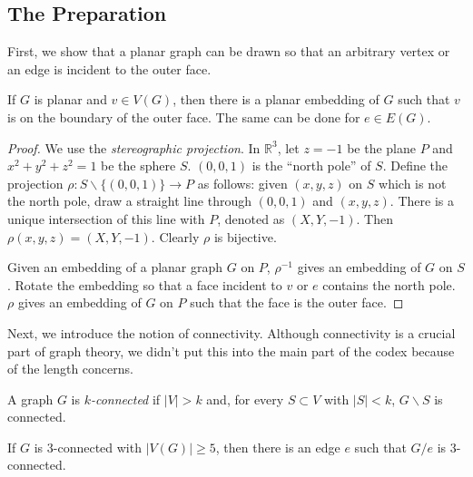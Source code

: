     \subsection{The Preparation}
    
        First, we show that a planar graph can be drawn so that an arbitrary vertex or an edge is incident to the outer face.
    
        \begin{lemma} \label{lem_stereographic}
            If $G$ is planar and $v \in V(G)$, then there is a planar embedding of $G$ such that $v$ is on the boundary of the outer face. The same can be done for $e \in E(G)$.
        \end{lemma}
        
        \begin{proof}
            We use the \emph{stereographic projection}. In $\mathbb{R}^3$, let $z=-1$ be the plane $P$ and $x^2+y^2+z^2=1$ be the sphere $S$. $(0,0,1)$ is the ``north pole'' of $S$. Define the projection $\rho: S \backslash \{(0,0,1)\} \rightarrow P$ as follows: given $(x,y,z)$ on $S$ which is not the north pole, draw a straight line through $(0,0,1)$ and $(x,y,z)$. There is a unique intersection of this line with $P$, denoted as $(X,Y,-1)$. Then $\rho(x,y,z)=(X,Y,-1)$. Clearly $\rho$ is bijective.
            
            Given an embedding of a planar graph $G$ on $P$, $\rho^{-1}$ gives an embedding of $G$ on $S$. Rotate the embedding so that a face incident to $v$ or $e$ contains the north pole. $\rho$ gives an embedding of $G$ on $P$ such that the face is the outer face.
        \end{proof}
        
        Next, we introduce the notion of connectivity. Although connectivity is a crucial part of graph theory, we didn't put this into the main part of the codex because of the length concerns.
    
        \begin{defn}[Connectivity] \label{def_connectivity}
            A graph $G$ is \emph{$k$-connected} if $|V| > k$ and, for every $S \subset V$ with $|S| < k$, $G \backslash S$ is connected.
        \end{defn}
        
        \begin{thm} \label{thm_3conn}
            If $G$ is 3-connected with $|V(G)| \geq 5$, then there is an edge $e$ such that $G/e$ is 3-connected.
        \end{thm}
        
